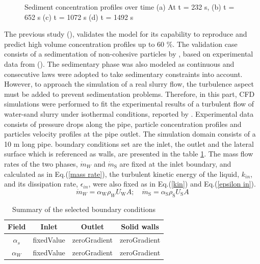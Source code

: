 \documentclass[11pt]{report}
\begin{document}
\begin{minipage}[t]{0.35\textwidth}
\begin{minipage}[t]{0.5\textwidth}
\begin{minipage}[t]{0.35\textwidth}
\begin{minipage}[t]{0.35\textwidth}
\begin{figure}[ht!]
 \end{figure}
%
 \begin{figure}[ht!]
 \centering
 \caption{Sediment concentration profiles over time (a) At t = 232 s, (b) t = 652 s (c) t = 1072 s (d) t = 1492 s}
 \label{fig:laminar}
 \end{figure}
%
The previous study (\citet{elkarii2020towards}), validates the model for its capability to reproduce and predict high volume concentration profiles up to 60 $\%$. 
%
The validation case consists of a sedimentation of non-cohesive particles by \citet{chauchat}, based on experimental data from (\citet{Pha-2008}). 
%
The sedimentary phase was also modeled as continuous and consecutive laws were adopted to take sedimentary constraints into account.
%
 However, to approach the simulation of a real slurry flow, the turbulence aspect must be added to prevent sedimentation problems. 
 Therefore, in this part, CFD simulations were performed to fit the experimental results of a turbulent flow of water-sand slurry under isothermal conditions, reported by \citet{Randal-2004}. 
 Experimental data consists of pressure drops along the pipe, particle concentration profiles and particles velocity profiles at the pipe outlet. 
 The simulation domain consists of a 10 m long pipe. boundary conditions set are the inlet, the outlet and the lateral surface which is referenced as walls, are presented in the table \ref{tab:bc}. 
 The mass flow rates of the two phases, \(\dot{m}_{W}\) and \(\dot{m}_{\mathrm{S}}\) are fixed at the inlet boundary, and calculated as in Eq.(\ref{mass rate}), the turbulent kinetic energy of the liquid, \(k_{in}\), 
 and its dissipation rate, \(\epsilon_{in }\), were also fixed as in Eq.(\ref{kin}) and Eq.(\ref{epsilon in}). 
\begin{equation}
 \dot{m}_{W}= \alpha_{\mathrm{W}} \rho_{W} U_{\mathrm{W}} A;\quad \dot{m}_{\mathrm{S}}= \alpha_{\mathrm{S}} \rho_{\mathrm{S}} U_{\mathrm{S}} A
 \label{mass rate}
 \end{equation}
%
 \begin{table}[ht!]
 \begin{center}
 \caption{Summary of the selected boundary conditions}
 \label{tab:bc}
 \begin{tabular}{cccc}
 \hline Field & Inlet & Outlet & Solid walls  \\
 \hline\(\alpha_{s}\) & fixedValue & zeroGradient & zeroGradient \\
 \(\alpha_{W}\) & fixedValue & zeroGradient & zeroGradient \\

\end{tabular}
\end{center}
\end{table}
\end{minipage}
\end{minipage}
\end{minipage}
\end{minipage}
\end{document}
